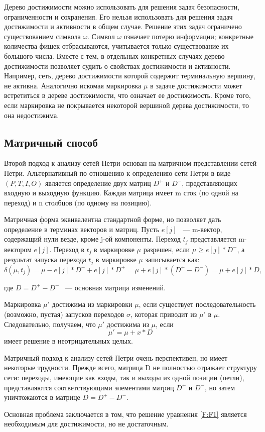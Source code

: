 Дерево достижимости можно использовать для решения задач безопасности, ограниченности и сохранения. Его нельзя использовать для решения задач достижимости и активности в общем случае. Решение этих задач ограничено существованием символа $ \omega $. Символ $ \omega $ означает потерю информации; конкретные количества фишек отбрасываются, учитывается только существование их большого числа. \cite{Piterson} Вместе с тем, в отдельных конкретных случаях дерево достижимости позволяет судить о свойствах достижимости и активности. Например, сеть, дерево достижимости которой содержит терминальную вершину, не активна. Аналогично искомая маркировка $ \mu $ в задаче достижимости может встретиться в дереве достижимости, что означает ее достижимость. Кроме того, если маркировка не покрывается некоторой вершиной дерева достижимости, то она недостижима.

\subsection{Матричный способ}

Второй подход к анализу сетей Петри основан на матричном представлении сетей Петри. Альтернативный по отношению к определению сети Петри в виде $ (P, T, I, O) $ является определение двух матриц $ D^{+} $ и $ D^{-} $, представляющих входную и выходную функцию. Каждая матрица имеет m сток (по одной на переход) и n столбцов (по одному на позицию).

Матричная форма эквивалентна стандартной форме, но позволяет дать определение в терминах векторов и матриц. Пусть $ e[j] $ ~--- m-вектор, содержащий нули везде, кроме j-ой компоненты. Переход $ t_{j} $ представляется m-вектором $ e[j] $. Переход в $ t_{j} $ в маркировке $ \mu $ разрешен, если $ \mu \geqslant e[j] * D^{-} $, а результат запуска перехода $ t_{j} $ в маркировке $ \mu $ записывается как:
\begin{equation}
\delta(\mu, t_{j}) = \mu - e[j] * D^{-} + e[j] * D^{+} = \mu + e[j] * (D^{+} - D^{-}) = \mu + e[j] * D,
\end{equation}

где $ D = D^{+} - D^{-} $ ~--- основная матрица изменений.

Маркировка $ \mu' $ достижима из маркировки $ \mu $, если существует последовательность (возможно, пустая) запусков переходов $ \sigma $, которая приводит из $ \mu' $ в $ \mu $. Следовательно, получаем, что $ \mu' $ достижима из $ \mu $, если 
\begin{equation}
\mu' = \mu + x * D
\label{F:F1}
\end{equation}
имеет решение в неотрицательных целых.

Матричный подход к анализу сетей Петри очень перспективен, но имеет некоторые трудности. Прежде всего, матрица D не полностью отражает структуру сети: переходы, имеющие как входы, так и выходы из одной позиции (петли), представляются соответствующими элементами матриц $ D^{+} $ и $ D^{-} $, но затем уничтожаются в матрице $ D = D^{+} - D^{-} $.

Основная проблема заключается в том, что решение уравнения \ref{F:F1} является необходимым для достижимости, но не достаточным.
